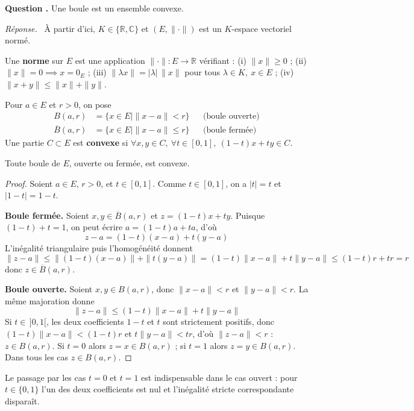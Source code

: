 \documentclass[11pt]{article}
\newcounter{qnum}
\newcommand{\question}[1]{%
\stepcounter{qnum}%
\bigskip
\noindent\textbf{Question \theqnum.} #1\par}
\newcommand{\reponse}{\noindent\textit{Réponse.}\ }
\begin{document}
\question{Une boule est un ensemble convexe.}
\reponse
À partir d'ici, $K\in\{\mathbb{R},\mathbb{C}\}$ et $(E,\|\cdot\|)$ est un $K$-espace vectoriel normé.

\begin{defi}
\label{defi:norme-boule}
Une \textbf{norme} sur $E$ est une application $\|\cdot\| : E\to\mathbb{R}$ vérifiant : (i) $\|x\|\geq 0$ ; (ii) $\|x\|=0\implies x=0_E$ ; (iii) $\|\lambda x\|=|\lambda|\,\|x\|$ pour tous $\lambda\in K,\ x\in E$ ; (iv) $\|x+y\|\leq\|x\|+\|y\|$.

Pour $a\in E$ et $r>0$, on pose
\begin{align*}
B(a,r) &= \{x\in E \mid \|x-a\|<r\} &&\text{(boule ouverte)}\\
\overline{B}(a,r) &= \{x\in E \mid \|x-a\|\leq r\} &&\text{(boule fermée)}
\end{align*}
Une partie $C\subset E$ est \textbf{convexe} si $\forall x,y\in C,\ \forall t\in[0,1],\ (1-t)x+ty\in C$.
\end{defi}

\begin{prop}
\label{prop:boule-convexe}
Toute boule de $E$, ouverte ou fermée, est convexe.
\end{prop}

\begin{proof}
Soient $a\in E$, $r>0$, et $t\in[0,1]$. Comme $t\in[0,1]$, on a $|t|=t$ et $|1-t|=1-t$.

\textbf{Boule fermée.} Soient $x,y\in\overline{B}(a,r)$ et $z=(1-t)x+ty$. Puisque $(1-t)+t=1$, on peut écrire $a=(1-t)a+ta$, d'où
\[z-a = (1-t)(x-a)+t(y-a)\]
L'inégalité triangulaire puis l'homogénéité donnent
\[\|z-a\| \leq \|(1-t)(x-a)\|+\|t(y-a)\| = (1-t)\|x-a\|+t\|y-a\| \leq (1-t)r+tr = r\]
donc $z\in\overline{B}(a,r)$.

\textbf{Boule ouverte.} Soient $x,y\in B(a,r)$, donc $\|x-a\|<r$ et $\|y-a\|<r$. La même majoration donne
\[\|z-a\| \leq (1-t)\|x-a\|+t\|y-a\|\]
Si $t\in\,]0,1[$, les deux coefficients $1-t$ et $t$ sont strictement positifs, donc $(1-t)\|x-a\|<(1-t)r$ et $t\|y-a\|<tr$, d'où $\|z-a\|<r$ : $z\in B(a,r)$. Si $t=0$ alors $z=x\in B(a,r)$ ; si $t=1$ alors $z=y\in B(a,r)$. Dans tous les cas $z\in B(a,r)$.
\end{proof}

\begin{remarque}
Le passage par les cas $t=0$ et $t=1$ est indispensable dans le cas ouvert : pour $t\in\{0,1\}$ l'un des deux coefficients est nul et l'inégalité stricte correspondante disparaît.
\end{remarque}
\end{document}
